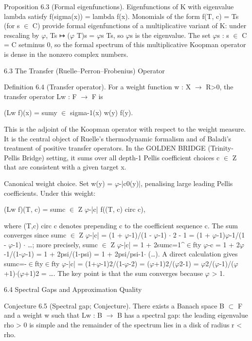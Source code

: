         Proposition 6.3 (Formal eigenfunctions). Eigenfunctions of K with eigenvalue
        lambda satisfy f(sigma(x)) = lambda f(x). Monomials of the form f(T, c) = Ts (for s
        $\in$ C) provide formal eigenfunctions of a multiplicative variant of K: under rescaling
        by $\varphi$, Ts ↦ ($\varphi$ T)s = $\varphi$s Ts, so $\varphi$s is the eigenvalue. The set {$\varphi$s : s $\in$ C} = C
        setminus {0}, so the formal spectrum of this multiplicative Koopman operator is
        dense in the nonzero complex numbers.

  6.3 The Transfer (Ruelle--Perron--Frobenius) Operator

        Definition 6.4 (Transfer operator). For a weight function w : X $\rightarrow$ R>0, the
        transfer operator Lw : F $\rightarrow$ F is

  (Lw f)(x) = sumy $\in$ sigma-1(x) w(y) f(y).

  This is the adjoint of the Koopman operator with respect to the weight measure. It is
  the central object of Ruelle's thermodynamic formalism and of Baladi's treatment of
  positive transfer operators. In the GOLDEN BRIDGE (Trinity-Pellis Bridge) setting, it sums over all depth-1 Pellis
  coefficient choices c $\in$ Z that are consistent with a given target x.

  Canonical weight choice. Set w(y) = $\varphi$-|c0(y)|, penalising large leading Pellis
  coefficients. Under this weight:

  (Lw f)(T, c) = sumc $\in$ Z $\varphi$-|c| f((T, c) circ c),

  where (T,c) circ c denotes prepending c to the coefficient sequence c. The sum
  converges since sumc $\in$ Z $\varphi$-|c| = (1 + $\varphi$-1)/(1 - $\varphi$-1) $\cdot$ 2 - 1 = (1 + $\varphi$-1)$\varphi$-1/(1 - $\varphi$-1) $\cdot$ …;
  more precisely, sumc $\in$ Z $\varphi$-|c| = 1 + 2sumc=1\textasciicircum{}$\in$fty $\varphi$-c = 1 + 2$\varphi$-1/(1-$\varphi$-1) = 1 +
  2psi/(1-psi) = 1 + 2psi/psi-1$\cdot$ (…). A direct calculation gives sumc=-$\in$fty$\in$fty $\varphi$-|c| =
  (1+$\varphi$-1)2/(1-$\varphi$-2) = ($\varphi$+1)2/($\varphi$2-1) = $\varphi$2/($\varphi$-1)/($\varphi$+1)$\cdot$($\varphi$+1)2 = …. The key point is that
  the sum converges because $\varphi$ > 1.

  6.4 Spectral Gaps and Approximation Quality

        Conjecture 6.5 (Spectral gap; Conjecture). There exists a Banach space B $\subset$ F
        and a weight w such that Lw : B $\rightarrow$ B has a spectral gap: the leading eigenvalue rho
        > 0 is simple and the remainder of the spectrum lies in a disk of radius r < rho.

